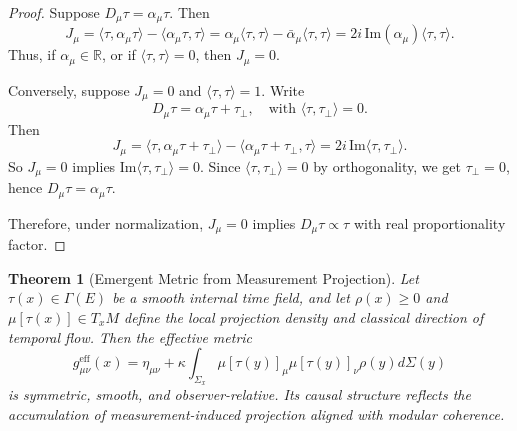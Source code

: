 \documentclass[11pt]{article}
\newtheorem{theorem}{Theorem}
\begin{document}
\begin{proof}
Suppose \( D_\mu \tau = \alpha_\mu \tau \). Then
\[
J_\mu = \langle \tau, \alpha_\mu \tau \rangle - \langle \alpha_\mu \tau, \tau \rangle = \alpha_\mu \langle \tau, \tau \rangle - \bar{\alpha}_\mu \langle \tau, \tau \rangle = 2i\, \mathrm{Im}(\alpha_\mu) \langle \tau, \tau \rangle.
\]
Thus, if \( \alpha_\mu \in \mathbb{R} \), or if \( \langle \tau, \tau \rangle = 0 \), then \( J_\mu = 0 \).

Conversely, suppose \( J_\mu = 0 \) and \( \langle \tau, \tau \rangle = 1 \). Write
\[
D_\mu \tau = \alpha_\mu \tau + \tau_\perp, \quad \text{with } \langle \tau, \tau_\perp \rangle = 0.
\]
Then
\[
J_\mu = \langle \tau, \alpha_\mu \tau + \tau_\perp \rangle - \langle \alpha_\mu \tau + \tau_\perp, \tau \rangle = 2i\, \mathrm{Im} \langle \tau, \tau_\perp \rangle.
\]
So \( J_\mu = 0 \) implies \( \mathrm{Im} \langle \tau, \tau_\perp \rangle = 0 \). Since \( \langle \tau, \tau_\perp \rangle = 0 \) by orthogonality, we get \( \tau_\perp = 0 \), hence \( D_\mu \tau = \alpha_\mu \tau \).

Therefore, under normalization, \( J_\mu = 0 \) implies \( D_\mu \tau \propto \tau \) with real proportionality factor.
\end{proof}


\begin{theorem}[Emergent Metric from Measurement Projection]\label{thm:emergent_metric}
Let \( \tau(x) \in \Gamma(E) \) be a smooth internal time field, and let \( \rho(x) \geq 0 \) and \( \mu[\tau(x)] \in T_x M \) define the local projection density and classical direction of temporal flow. Then the effective metric
\begin{equation}
g^{\text{eff}}_{\mu\nu}(x) = \eta_{\mu\nu} + \kappa \int_{\Sigma_x} \mu[\tau(y)]_\mu \mu[\tau(y)]_\nu \rho(y) d\Sigma(y)
\end{equation}
is symmetric, smooth, and observer-relative. Its causal structure reflects the accumulation of measurement-induced projection aligned with modular coherence.
\end{theorem}
\end{document}

